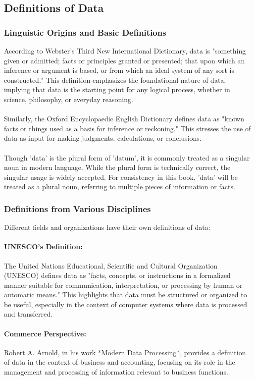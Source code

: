 \documentclass[12pt, oneside]{book}
\begin{document}
\subsection{Definitions of Data}
\subsubsection{Linguistic Origins and Basic Definitions}
According to Webster's Third New International Dictionary, data is "something given or admitted; facts or principles granted or presented; that upon which an inference or argument is based, or from which an ideal system of any sort is constructed." This definition emphasizes the foundational nature of data, implying that data is the starting point for any logical process, whether in science, philosophy, or everyday reasoning.\\\\
Similarly, the Oxford Encyclopaedic English Dictionary defines data as "known facts or things used as a basis for inference or reckoning." This stresses the use of data as input for making judgments, calculations, or conclusions.\\\\
Though 'data' is the plural form of 'datum', it is commonly treated as a singular noun in modern language. While the plural form is technically correct, the singular usage is widely accepted. For consistency in this book, 'data' will be treated as a plural noun, referring to multiple pieces of information or facts.\\
\subsubsection{Definitions from Various Disciplines}

Different fields and organizations have their own definitions of data:

\paragraph{UNESCO's Definition:} 
The United Nations Educational, Scientific and Cultural Organization (UNESCO) defines data as "facts, concepts, or instructions in a formalized manner suitable for communication, interpretation, or processing by human or automatic means." This highlights that data must be structured or organized to be useful, especially in the context of computer systems where data is processed and transferred.\\
\paragraph{Commerce Perspective:}
Robert A. Arnold, in his work *Modern Data Processing*, provides a definition of data in the context of business and accounting, focusing on its role in the management and processing of information relevant to business functions.\\
\end{document}
